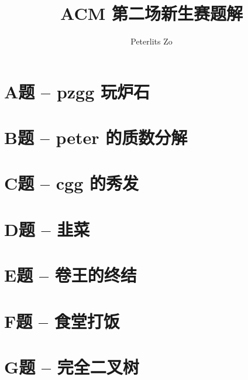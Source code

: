 \documentclass{ctexart}
\title{ACM 第二场新生赛题解}
\author{Peterlits Zo}
\begin{document}
\maketitle
\tableofcontents

\section{A题 -- pzgg 玩炉石}


\section{B题 -- peter 的质数分解}


\section{C题 -- cgg 的秀发}


\section{D题 -- 韭菜}


\section{E题 -- 卷王的终结}


\section{F题 -- 食堂打饭}


\section{G题 -- 完全二叉树}


\end{document}
